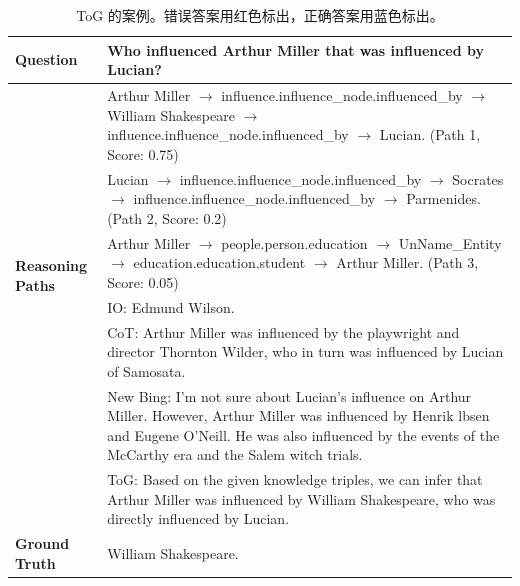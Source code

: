 \documentclass[11pt,UTF8,fontset=fandol]{ctexart}
\newcommand{\wrong}[1]{\textcolor{wrongred}{#1}}
\newcommand{\correct}[1]{\textcolor{rightblue}{#1}}
\begin{document}
\begin{table}[H]\centering
\caption{ToG 的案例。错误答案用\wrong{红色}标出，正确答案用\correct{蓝色}标出。}
\label{tab:19}
\small
\renewcommand{\arraystretch}{1.25}
\begin{tabular}{p{}p{}}
\toprule
\textbf{Question} & Who influenced Arthur Miller that was influenced by Lucian? \\
\midrule
\multirow{6}{*}{\parbox{0.16\textwidth}{\textbf{Reasoning Paths}}}
& Arthur Miller $\rightarrow$ influence.influence\_node.influenced\_by $\rightarrow$ William Shakespeare $\rightarrow$ influence.influence\_node.influenced\_by $\rightarrow$ Lucian. (Path 1, Score: 0.75) \\
& Lucian $\rightarrow$ influence.influence\_node.influenced\_by $\rightarrow$ Socrates $\rightarrow$ influence.influence\_node.influenced\_by $\rightarrow$ Parmenides. (Path 2, Score: 0.2) \\
& Arthur Miller $\rightarrow$ people.person.education $\rightarrow$ UnName\_Entity $\rightarrow$ education.education.student $\rightarrow$ Arthur Miller. (Path 3, Score: 0.05) \\
\midrule
\multirow{5}{*}{\textbf{Outputs}}
& IO: \wrong{Edmund Wilson.} \\
& CoT: Arthur Miller was influenced by the playwright and director \wrong{Thornton Wilder}, who in turn was influenced by Lucian of Samosata. \\
& New Bing: I'm not sure about Lucian's influence on Arthur Miller. However, Arthur Miller was influenced by \wrong{Henrik lbsen and Eugene O'Neill}. He was also influenced by the events of the McCarthy era and the Salem witch trials. \\
& ToG: Based on the given knowledge triples, we can infer that Arthur Miller was influenced by \correct{William Shakespeare}, who was directly influenced by Lucian. \\
\midrule
\textbf{Ground Truth} & William Shakespeare. \\
\bottomrule
\end{tabular}
\end{table}
\end{document}
